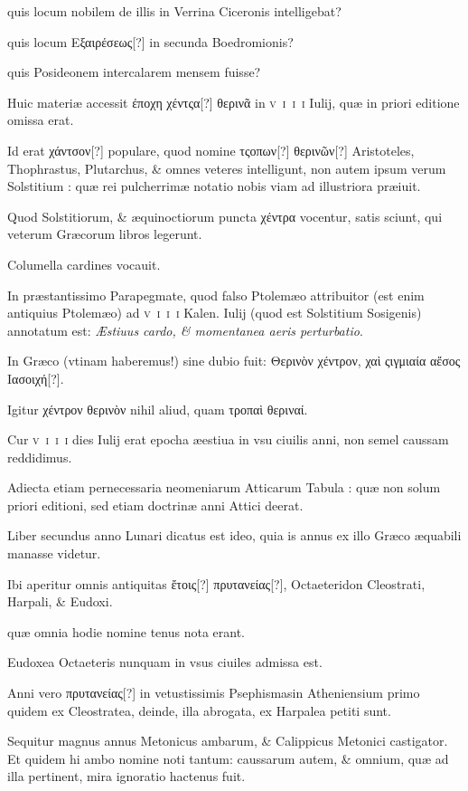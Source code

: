 \begin{parnumbers}
quis locum nobilem de illis in Verrina Ciceronis intelligebat?

quis locum \textgreek{Εξαιρέσεως[?]} in secunda Boedromionis?

quis Posideonem intercalarem mensem fuisse?

Huic materiæ accessit \textgreek{ἐποχη χέντςα[?] θερινᾶ} in \textsc{v~i~i~i} Iulij, quæ in priori editione omissa erat.

Id erat \textgreek{χάντσον[?]} populare, quod nomine \textgreek{τςοπων[?] θερινῶν[?]} Aristoteles, Thophrastus, Plutarchus, \& omnes veteres intelligunt, non autem ipsum verum Solstitium : quæ rei pulcherrimæ notatio nobis viam ad illustriora præiuit.

Quod Solstitiorum, \& æquinoctiorum puncta \textgreek{χέντρα} vocentur, satis sciunt, qui veterum Græcorum libros legerunt.

Columella cardines vocauit.

In præstantissimo Parapegmate, quod falso Ptolemæo attribuitor (est enim antiquius Ptolemæo) ad \textsc{v~i~i~i} Kalen. Iulij (quod est Solstitium Sosigenis) annotatum est: \textit{Æstiuus cardo, \& momentanea aeris perturbatio}.

In Græco (vtinam haberemus!) sine dubio fuit: \textgreek{Θερινὸν χέντρον, χαὶ ςιγμιαία αἔσος Ιασοιχή[?]}.

Igitur \textgreek{χέντρον θερινὸν} nihil aliud, quam \textgreek{τροπαὶ θεριναί}.

Cur \textsc{v~i~i~i} dies Iulij erat epocha æestiua in vsu ciuilis anni, non semel caussam reddidimus. 

Adiecta etiam pernecessaria neomeniarum Atticarum Tabula : quæ non solum priori editioni, sed etiam doctrinæ anni Attici deerat.

Liber secundus anno Lunari dicatus est ideo, quia is annus ex illo Græco æquabili manasse videtur.

Ibi aperitur omnis antiquitas \textgreek{ἔτοις[?] πρυτανείας[?]}, Octaeteridon Cleostrati, Harpali, \& Eudoxi.

quæ omnia hodie nomine tenus nota erant.

Eudoxea Octaeteris nunquam in vsus ciuiles admissa est.

Anni vero \textgreek{πρυτανείας[?]} in vetustissimis Psephismasin Atheniensium primo quidem ex Cleostratea, deinde, illa abrogata, ex Harpalea petiti sunt.

Sequitur magnus annus Metonicus
ambarum, \& Calippicus Metonici castigator.
Et quidem hi ambo nomine noti tantum: caussarum autem, \& omnium, quæ ad illa pertinent, mira ignoratio hactenus fuit.


\end{parnumbers}
